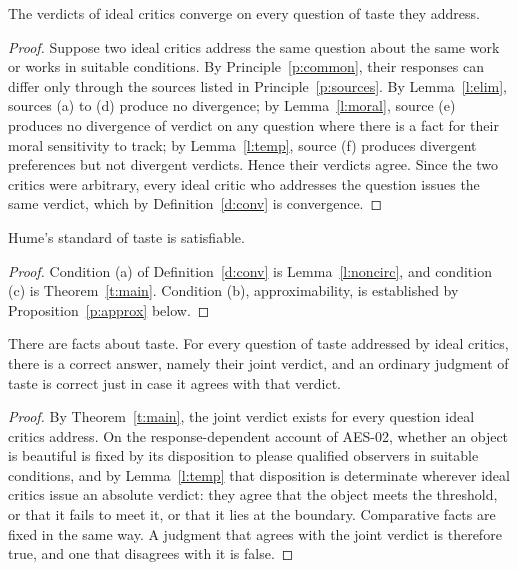 \documentclass{situationist-preprint}
\begin{document}
\begin{theorem}[Convergence]\label{t:main}
The verdicts of ideal critics converge on every question of taste they address.
\end{theorem}

\begin{proof}
Suppose two ideal critics address the same question about the same work or works in suitable conditions. By Principle~\ref{p:common}, their responses can differ only through the sources listed in Principle~\ref{p:sources}. By Lemma~\ref{l:elim}, sources (a) to (d) produce no divergence; by Lemma~\ref{l:moral}, source (e) produces no divergence of verdict on any question where there is a fact for their moral sensitivity to track; by Lemma~\ref{l:temp}, source (f) produces divergent preferences but not divergent verdicts. Hence their verdicts agree. Since the two critics were arbitrary, every ideal critic who addresses the question issues the same verdict, which by Definition~\ref{d:conv} is convergence.
\end{proof}

\begin{corollary}[Satisfiability]\label{c:satisf}
Hume's standard of taste is satisfiable.
\end{corollary}

\begin{proof}
Condition (a) of Definition~\ref{d:conv} is Lemma~\ref{l:noncirc}, and condition (c) is Theorem~\ref{t:main}. Condition (b), approximability, is established by Proposition~\ref{p:approx} below.
\end{proof}

\begin{corollary}\label{c:facts}
There are facts about taste. For every question of taste addressed by ideal critics, there is a correct answer, namely their joint verdict, and an ordinary judgment of taste is correct just in case it agrees with that verdict.
\end{corollary}

\begin{proof}
By Theorem~\ref{t:main}, the joint verdict exists for every question ideal critics address. On the response-dependent account of AES-02, whether an object is beautiful is fixed by its disposition to please qualified observers in suitable conditions, and by Lemma~\ref{l:temp} that disposition is determinate wherever ideal critics issue an absolute verdict: they agree that the object meets the threshold, or that it fails to meet it, or that it lies at the boundary. Comparative facts are fixed in the same way. A judgment that agrees with the joint verdict is therefore true, and one that disagrees with it is false.
\end{proof}
\end{document}
